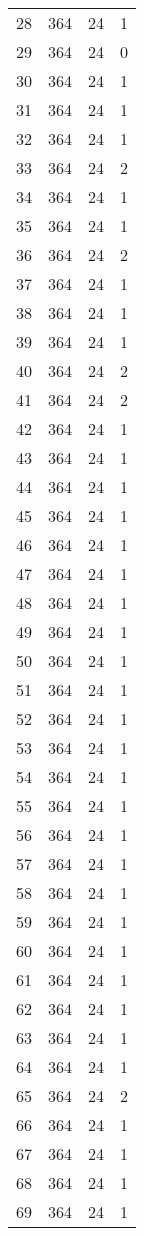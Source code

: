 \begin{longtable}[!]{c|ccc}
	28	& 364	& 24	& 1	\\
	29	& 364	& 24	& 0	\\
	30	& 364	& 24	& 1	\\
	31	& 364	& 24	& 1	\\
	32	& 364	& 24	& 1	\\
	33	& 364	& 24	& 2	\\
	34	& 364	& 24	& 1	\\
	35	& 364	& 24	& 1	\\
	36	& 364	& 24	& 2	\\
	37	& 364	& 24	& 1	\\
	38	& 364	& 24	& 1	\\
	39	& 364	& 24	& 1	\\
	40	& 364	& 24	& 2	\\
	41	& 364	& 24	& 2	\\
	42	& 364	& 24	& 1	\\
	43	& 364	& 24	& 1	\\
	44	& 364	& 24	& 1	\\
	45	& 364	& 24	& 1	\\
	46	& 364	& 24	& 1	\\
	47	& 364	& 24	& 1	\\
	48	& 364	& 24	& 1	\\
	49	& 364	& 24	& 1	\\
	50	& 364	& 24	& 1	\\
	51	& 364	& 24	& 1	\\
	52	& 364	& 24	& 1	\\
	53	& 364	& 24	& 1	\\
	54	& 364	& 24	& 1	\\
	55	& 364	& 24	& 1	\\
	56	& 364	& 24	& 1	\\
	57	& 364	& 24	& 1	\\
	58	& 364	& 24	& 1	\\
	59	& 364	& 24	& 1	\\
	60	& 364	& 24	& 1	\\
	61	& 364	& 24	& 1	\\
	62	& 364	& 24	& 1	\\
	63	& 364	& 24	& 1	\\
	64	& 364	& 24	& 1	\\
	65	& 364	& 24	& 2	\\
	66	& 364	& 24	& 1	\\
	67	& 364	& 24	& 1	\\
	68	& 364	& 24	& 1	\\
	69	& 364	& 24	& 1	\\

\end{longtable}
